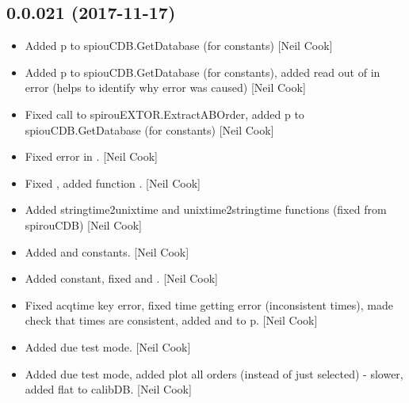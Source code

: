 \documentclass[a4paper,10pt,english]{report}
\begin{document}
\subsection{0.0.021 (2017-11-17)}
\label{\detokenize{misc/changelog:id530}}\begin{itemize}
\item {} 
Added p to spiouCDB.GetDatabase (for  constants) {[}Neil Cook{]}

\item {} 
Added p to spiouCDB.GetDatabase (for  constants), added read
out of  in error (helps to identify why error was caused)
{[}Neil Cook{]}

\item {} 
Fixed call to spirouEXTOR.ExtractABOrder, added p to
spiouCDB.GetDatabase (for  constants) {[}Neil Cook{]}

\item {} 
Fixed error in . {[}Neil Cook{]}

\item {} 
Fixed , added function
. {[}Neil Cook{]}

\item {} 
Added stringtime2unixtime and unixtime2stringtime functions (fixed
from spirouCDB) {[}Neil Cook{]}

\item {} 
Added  and  constants. {[}Neil Cook{]}

\item {} 
Added  constant, fixed  and
. {[}Neil Cook{]}

\item {} 
Fixed acqtime key error, fixed time getting error (inconsistent
times), made check that times are consistent, added  and
 to p. {[}Neil Cook{]}

\item {} 
Added due test mode. {[}Neil Cook{]}

\item {} 
Added due test mode, added plot all orders (instead of just selected)
- slower, added flat to calibDB. {[}Neil Cook{]}


\end{itemize}
\end{document}
